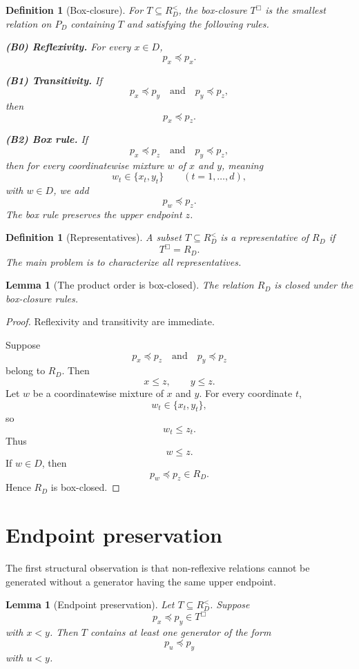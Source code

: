 \documentclass[11pt]{article}
\newtheorem{definition}[theorem]{Definition}
\newtheorem{lemma}[theorem]{Lemma}
\begin{document}
\begin{definition}[Box-closure]
For $T\subseteq R_D^{<}$, the \emph{box-closure} $T^\Box$ is the smallest relation on $P_D$ containing $T$ and satisfying the following rules.

\noindent\textbf{(B0) Reflexivity.}
For every $x\in D$,
\[
p_x\preceq p_x.
\]

\noindent\textbf{(B1) Transitivity.}
If
\[
p_x\preceq p_y
\quad\text{and}\quad
p_y\preceq p_z,
\]
then
\[
p_x\preceq p_z.
\]

\noindent\textbf{(B2) Box rule.}
If
\[
p_x\preceq p_z
\quad\text{and}\quad
p_y\preceq p_z,
\]
then for every coordinatewise mixture $w$ of $x$ and $y$, meaning
\[
w_t\in\{x_t,y_t\}
\qquad(t=1,\dots,d),
\]
with $w\in D$, we add
\[
p_w\preceq p_z.
\]
The box rule preserves the upper endpoint $z$.
\end{definition}

\begin{definition}[Representatives]
A subset $T\subseteq R_D^{<}$ is a \emph{representative} of $R_D$ if
\[
T^\Box=R_D.
\]
The main problem is to characterize all representatives.
\end{definition}

\begin{lemma}[The product order is box-closed]
The relation $R_D$ is closed under the box-closure rules.
\end{lemma}

\begin{proof}
Reflexivity and transitivity are immediate.

Suppose
\[
p_x\preceq p_z
\quad\text{and}\quad
p_y\preceq p_z
\]
belong to $R_D$. Then
\[
x\le z,\qquad y\le z.
\]
Let $w$ be a coordinatewise mixture of $x$ and $y$. For every coordinate $t$,
\[
w_t\in\{x_t,y_t\},
\]
so
\[
w_t\le z_t.
\]
Thus
\[
w\le z.
\]
If $w\in D$, then
\[
p_w\preceq p_z\in R_D.
\]
Hence $R_D$ is box-closed.
\end{proof}

\section{Endpoint preservation}

The first structural observation is that non-reflexive relations cannot be generated without a generator having the same upper endpoint.

\begin{lemma}[Endpoint preservation]
Let $T\subseteq R_D^{<}$. Suppose
\[
p_x\preceq p_y\in T^\Box
\]
with $x<y$. Then $T$ contains at least one generator of the form
\[
p_u\preceq p_y
\]
with $u<y$.
\end{lemma}
\end{document}
